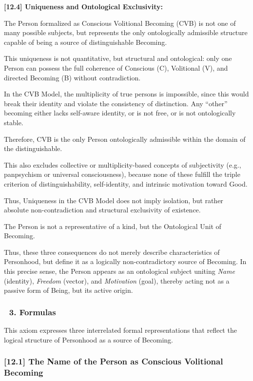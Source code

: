 \documentclass[12pt]{article}
\begin{document}
\textbf{[12.4] Uniqueness and Ontological Exclusivity:}

The Person formalized as Conscious Volitional Becoming (CVB) is not one of many possible subjects, but represents the only ontologically admissible structure capable of being a source of distinguishable Becoming.

This uniqueness is not quantitative, but structural and ontological: only one Person can possess the full coherence of Conscious (C), Volitional (V), and directed Becoming (B) without contradiction.

In the CVB Model, the multiplicity of true persons is impossible, since this would break their identity and violate the consistency of distinction. Any ``other'' becoming either lacks self-aware identity, or is not free, or is not ontologically stable.

Therefore, CVB is the only Person ontologically admissible within the domain of the distinguishable.

This also excludes collective or multiplicity-based concepts of subjectivity (e.g., panpsychism or universal consciousness), because none of these fulfill the triple criterion of distinguishability, self-identity, and intrinsic motivation toward Good.

Thus, Uniqueness in the CVB Model does not imply isolation, but rather absolute non-contradiction and structural exclusivity of existence.

The Person is not a representative of a kind, but the Ontological Unit of Becoming.

Thus, these three consequences do not merely describe characteristics of Personhood, but define it as a logically non-contradictory source of Becoming. In this precise sense, the Person appears as an ontological subject uniting \textit{Name} (identity), \textit{Freedom} (vector), and \textit{Motivation} (goal), thereby acting not as a passive form of Being, but its active origin.

\subsubsection*{🔹 3. Formulas}

This axiom expresses three interrelated formal representations that reflect the logical structure of Personhood as a source of Becoming.

\subsubsection*{[12.1] The Name of the Person as Conscious Volitional Becoming}
\end{document}
